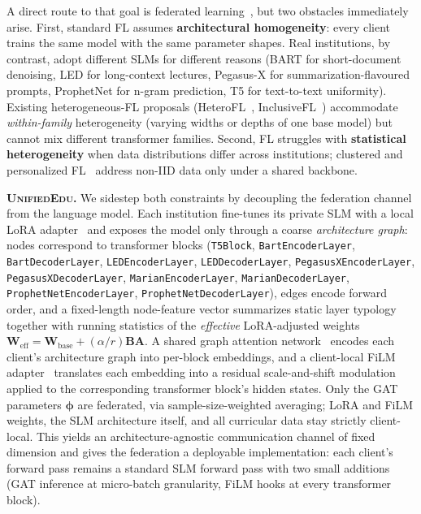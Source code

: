 \documentclass[11pt]{article}
\theoremstyle{plain}
\theoremstyle{definition}
\theoremstyle{remark}
\newcommand{\UniEdu}{\textsc{UnifiedEdu}}
\begin{document}
A direct route to that goal is federated
learning~\citep{mcmahan2017communication,
li2020federated, kairouz2021advances}, but two
obstacles immediately arise. First, standard FL
assumes \textbf{architectural homogeneity}: every
client trains the same model with the same parameter
shapes. Real institutions, by contrast, adopt
different SLMs for different reasons (BART for
short-document denoising, LED for long-context
lectures, Pegasus-X for summarization-flavoured
prompts, ProphetNet for n-gram prediction, T5 for
text-to-text uniformity). Existing heterogeneous-FL
proposals (HeteroFL~\citep{diao2021heterofl},
InclusiveFL~\citep{liu2022no}) accommodate \emph{within-family}
heterogeneity (varying widths or depths of one base
model) but cannot mix different transformer families.
Second, FL struggles with \textbf{statistical
heterogeneity} when data distributions differ across
institutions; clustered and personalized
FL~\citep{sattler2020clustered, li2021fedbn} address
non-IID data only under a shared backbone.

\textbf{\UniEdu{}.}
We sidestep both constraints by decoupling the
federation channel from the language model. Each
institution fine-tunes its private SLM with a local
LoRA adapter~\citep{hu2022lora} and exposes the model
only through a coarse \emph{architecture graph}:
nodes correspond to transformer blocks
(\texttt{T5Block}, \texttt{BartEncoderLayer},
\texttt{BartDecoderLayer}, \texttt{LEDEncoderLayer},
\texttt{LEDDecoderLayer}, \texttt{PegasusXEncoderLayer},
\texttt{PegasusXDecoderLayer},
\texttt{MarianEncoderLayer}, \texttt{MarianDecoderLayer},
\texttt{ProphetNetEncoderLayer},
\texttt{ProphetNetDecoderLayer}), edges encode forward
order, and a fixed-length node-feature vector
summarizes static layer typology together with running
statistics of the \emph{effective} LoRA-adjusted
weights $\mathbf{W}_{\text{eff}} =
\mathbf{W}_{\text{base}} + (\alpha/r)\mathbf{B}\mathbf{A}$.
A shared graph attention
network~\citep{velickovic2018graph} encodes each
client's architecture graph into per-block embeddings,
and a client-local FiLM
adapter~\citep{perez2018film} translates each
embedding into a residual scale-and-shift modulation
applied to the corresponding transformer block's
hidden states. Only the GAT parameters
$\boldsymbol{\phi}$ are federated, via
sample-size-weighted averaging; LoRA and FiLM weights,
the SLM architecture itself, and all curricular data
stay strictly client-local. This yields an
architecture-agnostic communication channel of fixed
dimension and gives the federation a deployable
implementation: each client's forward pass remains a
standard SLM forward pass with two small additions
(GAT inference at micro-batch granularity, FiLM hooks
at every transformer block).
\end{document}
